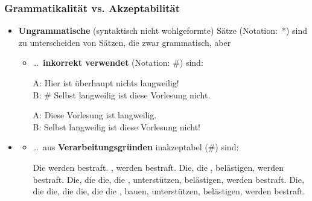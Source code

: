 \begin{frame}
\frametitle{Grammatikalität vs. Akzeptabilität}

\begin{itemize}
	\item \textbf{Ungrammatische} (syntaktisch nicht wohlgeformte) Sätze (Notation:~*) sind zu unterscheiden von Sätzen, die zwar grammatisch, aber
	
	\begin{itemize}
		\item \dots\ \textbf{inkorrekt verwendet} (Notation: \#) sind:

		\ea A: Hier ist überhaupt nichts langweilig!\\
		B: \# Selbst langweilig ist diese Vorlesung nicht.
		\z
\pause

		\ea A: Diese Vorlesung ist langweilig.\\
		B: Selbst langweilig ist diese Vorlesung nicht!
		\z
		
	\end{itemize}

\end{itemize}

\nocite{Coseriu88a, Fries15a, Repp&Co15a}

\end{frame}


\begin{frame}

\begin{itemize}
	\item[]
	
	\begin{itemize}
	\item \dots\ aus \textbf{Verarbeitungsgründen} inakzeptabel (\#) sind:
		
\pause
		\ex Die werden bestraft.
		\ex {}, werden bestraft.
		\ex Die, die , belästigen, werden bestraft.
		\ex Die, die die, die , unterstützen, belästigen, werden bestraft.
		\ex Die, die die, die die, die die , bauen, unterstützen, belästigen, werden bestraft.
		\z
\end{itemize}

\end{itemize}
\nocite{Fries15a, Repp&Co15a}
\end{frame}


